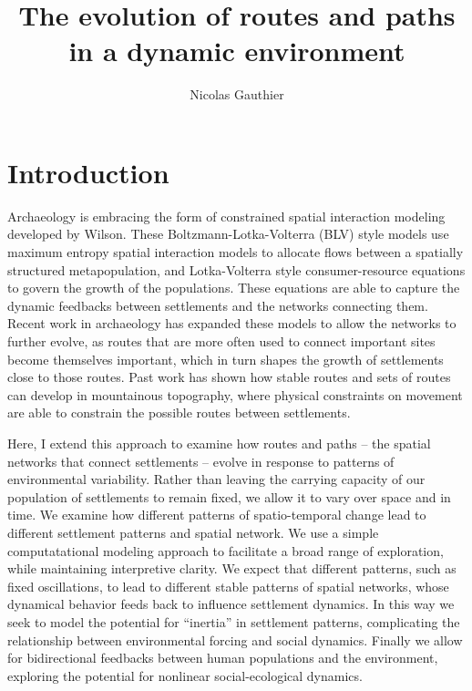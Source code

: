 \documentclass[]{elsarticle} %
\begin{document}
\begin{frontmatter}

  \title{The evolution of routes and paths in a dynamic environment}
    \author[Arizona State University]{Nicolas Gauthier}
      \address[Arizona State University]{School of Human Evolution and Social Change, S. Caddy Mall, Tempe, AZ,
Zip}
  
  \begin{abstract}
  
  \end{abstract}
  
 \end{frontmatter}

\section{Introduction}\label{introduction}

Archaeology is embracing the form of constrained spatial interaction
modeling developed by Wilson. These Boltzmann-Lotka-Volterra (BLV) style
models use maximum entropy spatial interaction models to allocate flows
between a spatially structured metapopulation, and Lotka-Volterra style
consumer-resource equations to govern the growth of the populations.
These equations are able to capture the dynamic feedbacks between
settlements and the networks connecting them. Recent work in archaeology
has expanded these models to allow the networks to further evolve, as
routes that are more often used to connect important sites become
themselves important, which in turn shapes the growth of settlements
close to those routes. Past work has shown how stable routes and sets of
routes can develop in mountainous topography, where physical constraints
on movement are able to constrain the possible routes between
settlements.

Here, I extend this approach to examine how routes and paths -- the
spatial networks that connect settlements -- evolve in response to
patterns of environmental variability. Rather than leaving the carrying
capacity of our population of settlements to remain fixed, we allow it
to vary over space and in time. We examine how different patterns of
spatio-temporal change lead to different settlement patterns and spatial
network. We use a simple computatational modeling approach to facilitate
a broad range of exploration, while maintaining interpretive clarity. We
expect that different patterns, such as fixed oscillations, to lead to
different stable patterns of spatial networks, whose dynamical behavior
feeds back to influence settlement dynamics. In this way we seek to
model the potential for ``inertia'' in settlement patterns, complicating
the relationship between environmental forcing and social dynamics.
Finally we allow for bidirectional feedbacks between human populations
and the environment, exploring the potential for nonlinear
social-ecological dynamics.
\end{document}
